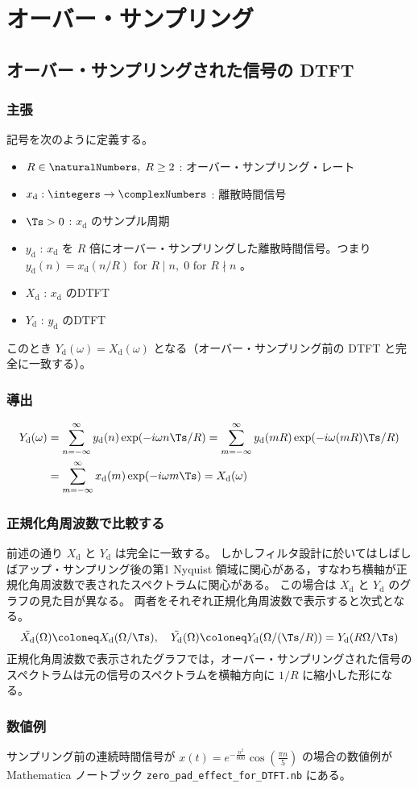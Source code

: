 \chapter{オーバー・サンプリング}
    \section{オーバー・サンプリングされた信号の DTFT}
        \label{オーバー・サンプリングされた信号の DTFT}
        \newcommand*{\xd}{x_\text{d}}
        \newcommand*{\yd}{y_\text{d}}
        \newcommand*{\Xd}{X_\text{d}}
        \newcommand*{\Yd}{Y_\text{d}}
        \subsection{主張}
            記号を次のように定義する。
            \begin{itemize}
                \item $R\in\naturalNumbers,\;R\geq 2$ : オーバー・サンプリング・レート
                \item $\xd:\integers\to\complexNumbers$ : 離散時間信号
                \item $\Ts>0$ : $\xd$ のサンプル周期
                \item $\yd$ : $\xd$ を $R$ 倍にオーバー・サンプリングした離散時間信号。つまり $\yd(n) = \xd(n/R)\text{ for }R\mid n,\;0\text{ for }R\nmid n$ 。
                \item $\Xd$ : $\xd$ のDTFT
                \item $\Yd$ : $\yd$ のDTFT
            \end{itemize}
            このとき $\Yd(\omega) = \Xd(\omega)$ となる（オーバー・サンプリング前の DTFT と完全に一致する）。
        \subsection{導出}
            \begin{align*}
                \Yd(\omega) &= \sum_{n=-\infty}^\infty \yd(n)\exp(-i\omega n\Ts/R) = \sum_{m=-\infty}^\infty \yd(mR)\exp(-i\omega (mR)\Ts/R) \\
                &= \sum_{m=-\infty}^\infty \xd(m)\exp(-i\omega m\Ts) = \Xd(\omega)
            \end{align*}
        \subsection{正規化角周波数で比較する}
            前述の通り $\Xd$ と $\Yd$ は完全に一致する。
            しかしフィルタ設計に於いてはしばしばアップ・サンプリング後の第1 Nyquist 領域に関心がある，すなわち横軸が正規化角周波数で表されたスペクトラムに関心がある。
            この場合は $\Xd$ と $\Yd$ のグラフの見た目が異なる。
            両者をそれぞれ正規化角周波数で表示すると次式となる。
            \[ \tilde{\Xd}(\Omega) \coloneq \Xd(\Omega/\Ts),\quad \tilde{\Yd}(\Omega) \coloneq \Yd(\Omega/(\Ts/R)) = \Yd(R\Omega/\Ts) \]
            正規化角周波数で表示されたグラフでは，オーバー・サンプリングされた信号のスペクトラムは元の信号のスペクトラムを横軸方向に $1/R$ に縮小した形になる。
        \subsection{数値例}
            サンプリング前の連続時間信号が $x(t) = e^{-\frac{n^2}{800}}\cos\left(\frac{\pi n}{5}\right)$ の場合の数値例が Mathematica ノートブック \verb|zero_pad_effect_for_DTFT.nb| にある。

